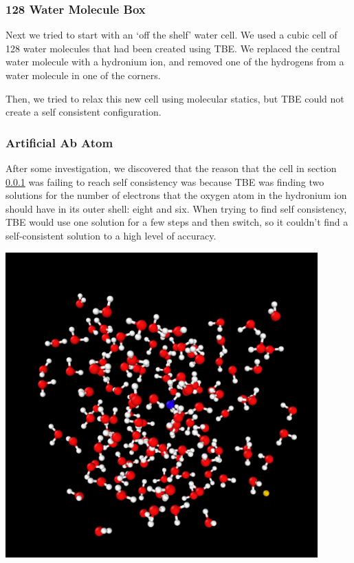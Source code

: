 \documentclass{article}
\newenvironment{Figure}{\par\medskip\noindent\minipage{\linewidth}}{\endminipage\par\medskip}
\begin{document}
\begin{multicols}{2}
\subsubsection{128 Water Molecule Box}
\label{sec:128}
Next we tried to start with an `off the shelf' water cell. We used a cubic cell of 128 water molecules that had been created using TBE. We replaced the central water molecule with a hydronium ion, and removed one of the hydrogens from a water molecule in one of the corners.

Then, we tried to relax this new cell using molecular statics, but TBE could not create a self consistent configuration.

\subsubsection{Artificial Ab Atom}
After some investigation, we discovered that the reason that the cell in section \ref{sec:128} was failing to reach self consistency was because TBE was finding two solutions for the number of electrons that the oxygen atom in the hydronium ion should have in its outer shell: eight and six. When trying to find self consistency, TBE would use one solution for a few steps and then switch, so it couldn't find a self-consistent solution to a high level of accuracy.
\begin{Figure}
	\centering
	\includegraphics[width=0.9\textwidth]{figures/Ab}
	\label{fig:Ab}	
\end{Figure}


\end{multicols}
\end{document}
